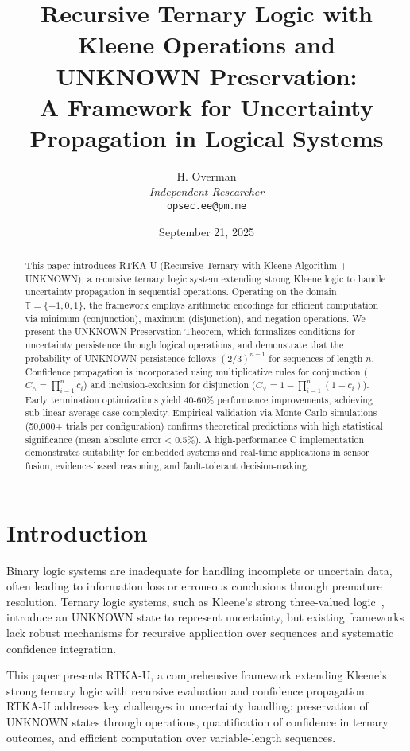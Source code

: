 \documentclass[11pt,a4paper]{article}
\title{Recursive Ternary Logic with Kleene Operations and UNKNOWN Preservation:\\
A Framework for Uncertainty Propagation in Logical Systems}
\author{H. Overman\\
\textit{Independent Researcher}\\
\texttt{opsec.ee@pm.me}}
\date{September 21, 2025}
\begin{document}
\maketitle

\begin{abstract}
This paper introduces RTKA-U (Recursive Ternary with Kleene Algorithm + UNKNOWN), a recursive ternary logic system extending strong Kleene logic to handle uncertainty propagation in sequential operations. Operating on the domain $\mathbb{T} = \{-1, 0, 1\}$, the framework employs arithmetic encodings for efficient computation via minimum (conjunction), maximum (disjunction), and negation operations. We present the UNKNOWN Preservation Theorem, which formalizes conditions for uncertainty persistence through logical operations, and demonstrate that the probability of UNKNOWN persistence follows $(2/3)^{n-1}$ for sequences of length $n$. Confidence propagation is incorporated using multiplicative rules for conjunction ($C_{\land} = \prod_{i=1}^n c_i$) and inclusion-exclusion for disjunction ($C_{\lor} = 1 - \prod_{i=1}^n (1 - c_i)$). Early termination optimizations yield 40-60\% performance improvements, achieving sub-linear average-case complexity. Empirical validation via Monte Carlo simulations (50,000+ trials per configuration) confirms theoretical predictions with high statistical significance (mean absolute error < 0.5\%). A high-performance C implementation demonstrates suitability for embedded systems and real-time applications in sensor fusion, evidence-based reasoning, and fault-tolerant decision-making.
\end{abstract}

\section{Introduction}

Binary logic systems are inadequate for handling incomplete or uncertain data, often leading to information loss or erroneous conclusions through premature resolution. Ternary logic systems, such as Kleene's strong three-valued logic~\cite{kleene1952}, introduce an UNKNOWN state to represent uncertainty, but existing frameworks lack robust mechanisms for recursive application over sequences and systematic confidence integration.

This paper presents RTKA-U, a comprehensive framework extending Kleene's strong ternary logic with recursive evaluation and confidence propagation. RTKA-U addresses key challenges in uncertainty handling: preservation of UNKNOWN states through operations, quantification of confidence in ternary outcomes, and efficient computation over variable-length sequences.
\end{document}
